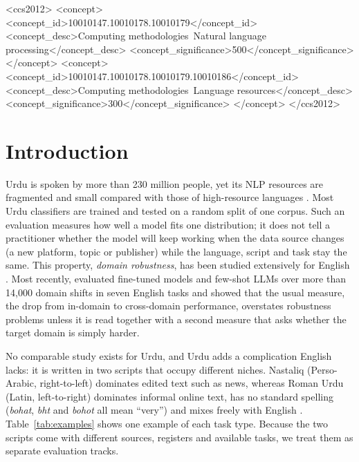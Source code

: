 \documentclass[acmsmall,screen]{acmart}
\begin{document}
\begin{CCSXML}
<ccs2012>
<concept>
<concept_id>10010147.10010178.10010179</concept_id>
<concept_desc>Computing methodologies~Natural language processing</concept_desc>
<concept_significance>500</concept_significance>
</concept>
<concept>
<concept_id>10010147.10010178.10010179.10010186</concept_id>
<concept_desc>Computing methodologies~Language resources</concept_desc>
<concept_significance>300</concept_significance>
</concept>
</ccs2012>
\end{CCSXML}


\maketitle

\section{Introduction}
Urdu is spoken by more than 230 million people, yet its NLP resources are fragmented and small compared with those of high-resource languages \citep{daud2017urdu}. Most Urdu classifiers are trained and tested on a random split of one corpus. Such an evaluation measures how well a model fits one distribution; it does not tell a practitioner whether the model will keep working when the data source changes (a new platform, topic or publisher) while the language, script and task stay the same. This property, \emph{domain robustness}, has been studied extensively for English \citep{blitzer2007biographies,hendrycks2020pretrained,ramponi2020neural}. Most recently, \citet{calderon2024measuring} evaluated fine-tuned models and few-shot LLMs over more than 14{,}000 domain shifts in seven English tasks and showed that the usual measure, the drop from in-domain to cross-domain performance, overstates robustness problems unless it is read together with a second measure that asks whether the target domain is simply harder.

No comparable study exists for Urdu, and Urdu adds a complication English lacks: it is written in two scripts that occupy different niches. Nastaliq (Perso-Arabic, right-to-left) dominates edited text such as news, whereas Roman Urdu (Latin, left-to-right) dominates informal online text, has no standard spelling (\textit{bohat}, \textit{bht} and \textit{bohot} all mean ``very'') and mixes freely with English \citep{bali2014borrowing,sitaram2019survey}. Table~\ref{tab:examples} shows one example of each task type. Because the two scripts come with different sources, registers and available tasks, we treat them as separate evaluation tracks.
\end{document}
